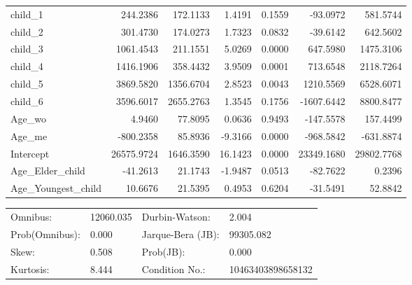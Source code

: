 \begin{subappendices}
\begin{table}[H]
{\begin{tabular}{lrrrrrr}
$$child_1                                   &   244.2386 &  172.1133 &  1.4191 &      0.1559 &    -93.0972 &   581.5744  \\
child_2                                   &   301.4730 &  174.0273 &  1.7323 &      0.0832 &    -39.6142 &   642.5602  \\
child_3                                   &  1061.4543 &  211.1551 &  5.0269 &      0.0000 &    647.5980 &  1475.3106  \\
child_4                                   &  1416.1906 &  358.4432 &  3.9509 &      0.0001 &    713.6548 &  2118.7264  \\
child_5                                   &  3869.5820 & 1356.6704 &  2.8523 &      0.0043 &   1210.5569 &  6528.6071  \\
child_6                                   &  3596.6017 & 2655.2763 &  1.3545 &      0.1756 &  -1607.6442 &  8800.8477  \\
Age_wo                                    &     4.9460 &   77.8095 &  0.0636 &      0.9493 &   -147.5578 &   157.4499  \\
Age_me                                    &  -800.2358 &   85.8936 & -9.3166 &      0.0000 &   -968.5842 &  -631.8874  \\
Intercept                                 & 26575.9724 & 1646.3590 & 16.1423 &      0.0000 &  23349.1680 & 29802.7768  \\
Age_Elder_child                           &   -41.2613 &   21.1743 & -1.9487 &      0.0513 &    -82.7622 &     0.2396  \\
Age_Youngest_child                        &    10.6676 &   21.5395 &  0.4953 &      0.6204 &    -31.5491 &    52.8842  \\
\hline
\end{tabular}
}
\begin{center}
\begin{tabular}{llll}
\hline
Omnibus:       & 12060.035 & Durbin-Watson:    & 2.004              \\
Prob(Omnibus): & 0.000     & Jarque-Bera (JB): & 99305.082          \\
Skew:          & 0.508     & Prob(JB):         & 0.000              \\
Kurtosis:      & 8.444     & Condition No.:    & 10463403898658132  \\
\hline
\end{tabular}
\end{center}
\end{table}


\end{subappendices}
